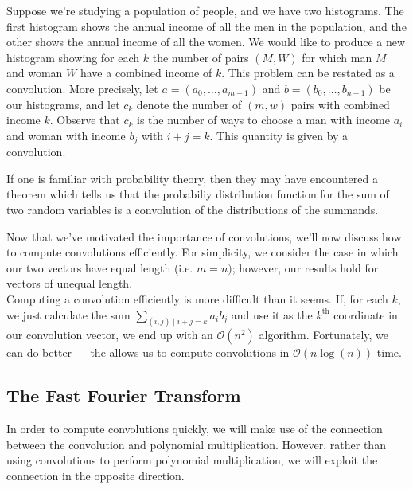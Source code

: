 \begin{example}
Suppose we're studying a population of people, and we have two histograms. The first histogram shows the annual income of all the men in the population, and the other shows the annual income of all the women. We would like to produce a new histogram showing for each $k$ the number of pairs $(M, W)$ for which man $M$ and woman $W$ have a combined income of $k$. This problem can be restated as a convolution. More precisely, let $a = (a_0, \ldots, a_{m - 1})$ and $b = (b_0, \ldots, b_{n - 1})$ be our histograms, and let $c_k$ denote the number of $(m, w)$ pairs with combined income $k$. Observe that $c_k$ is the number of ways to choose a man with income $a_i$ and woman with income $b_j$ with $i + j = k$. This quantity is given by a convolution.
\end{example}

\begin{example}
If one is familiar with probability theory, then they may have encountered a theorem which tells us that the probabiliy distribution function for the sum of two random variables is a convolution of the distributions of the summands.
\end{example}

Now that we've motivated the importance of convolutions, we'll now discuss how to compute convolutions efficiently. For simplicity, we consider the case in which our two vectors have equal length (i.e. $m = n)$; however, our results hold for vectors of unequal length. \\

Computing a convolution efficiently is more difficult than it seems. If, for each $k$, we just calculate the sum $\sum_{(i, j) \mid i + j = k} a_ib_j$ and use it as the $k^{\text{th}}$ coordinate in our convolution vector, we end up with an $\mathcal{O}(n^2)$ algorithm. Fortunately, we can do better --- the  allows us to compute convolutions in $\mathcal{O}(n\log(n))$ time.

\subsection{The Fast Fourier Transform}

In order to compute convolutions quickly, we will make use of the connection between the convolution and polynomial multiplication. However, rather than using convolutions to perform polynomial multiplication, we will exploit the connection in the opposite direction. \\


